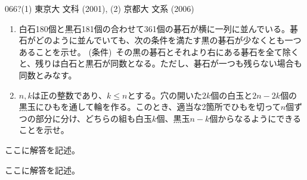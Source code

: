 \begin{prob}{066}{\hosi ?}{(1) 東京大 文科 (2001), (2) 京都大 文系 (2006)}
 \begin{enumerate}
  \item 白石180個と黒石181個の合わせて361個の碁石が横に一列に並んでいる。碁石がどのように並んでいても、次の条件を満たす黒の碁石が少なくとも一つあることを示せ。
	(条件)~その黒の碁石とそれより右にある碁石を全て除くと、残りは白石と黒石が同数となる。ただし、碁石が一つも残らない場合も同数とみなす。
  \item $n, k$は正の整数であり、$k\le n$とする。穴の開いた$2k$個の白玉と$2n-2k$個の黒玉にひもを通して輪を作る。このとき、適当な2箇所でひもを切って$n$個ずつの部分に分け、どちらの組も白玉$k$個、黒玉$n-k$個からなるようにできることを示せ。
 \end{enumerate}
\end{prob}
ここに解答を記述。

ここに解答を記述。